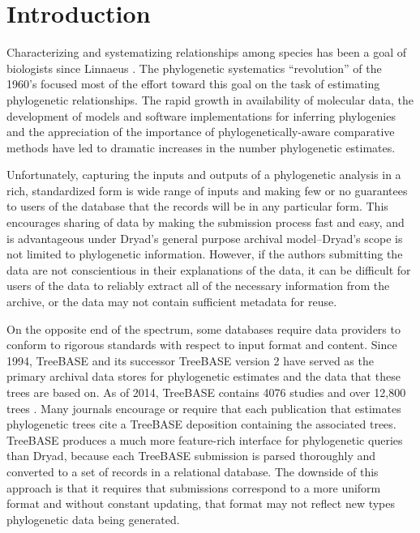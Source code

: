 \documentclass{bioinfo}
\begin{document}
\section{Introduction}

Characterizing and systematizing relationships among species has been a goal of biologists since Linnaeus \cite{Linne1758}.
The phylogenetic systematics ``revolution'' of the 1960's focused most of the effort toward this goal on the 
    task of estimating phylogenetic relationships.
The rapid growth in availability of molecular data, the development of models and software implementations for
    inferring phylogenies and the appreciation of the importance of phylogenetically-aware comparative methods
    \citep[e.g.][]{Felsenstein1985Comp} have led to dramatic increases in the number phylogenetic estimates.


Unfortunately, capturing the inputs and outputs of a phylogenetic analysis in a rich, standardized form is
    wide range of inputs and making few or no
    guarantees to users of the database that the records will be in any particular form.
This encourages sharing of data by making the submission process fast and easy, and is advantageous under Dryad's
    general purpose archival model--Dryad's scope is not limited to phylogenetic information.
However, if the authors submitting the data are not conscientious in their explanations of the data, it can be difficult
    for users of the data to reliably extract all of the necessary information from the archive, or the data may not contain sufficient metadata for reuse.

On the opposite end of the spectrum, some databases require data providers to conform to rigorous
    standards with respect to input format and content.
Since 1994, TreeBASE \citep{SandersonDPE1994} and its successor TreeBASE version 2 \citep{TreeBase2} have served
    as the primary archival data stores for phylogenetic estimates and the data that these trees are based on.
As of 2014, TreeBASE contains 4076 studies and over 12,800 trees \citep{TreeBaseWebCite}.
Many journals encourage or require that each publication that estimates phylogenetic trees cite a TreeBASE
    deposition containing the associated trees.
TreeBASE produces a much more feature-rich interface for phylogenetic queries than Dryad, because each 
    TreeBASE submission is parsed thoroughly and converted to a set of records in a relational database.
The downside of this approach is that it requires that submissions correspond to a more uniform format and without constant updating,
    that format may not reflect new types phylogenetic data being generated.
\end{document}
